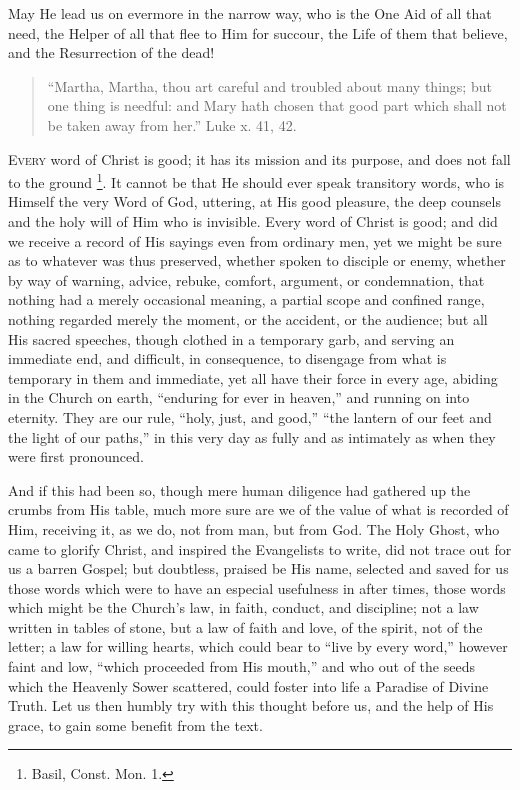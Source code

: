 May He lead us on evermore in the narrow way, who is the One Aid of
all that need, the Helper of all that flee to Him for succour, the
Life of them that believe, and the Resurrection of the dead!


\begin{quote}

``Martha, Martha, thou art careful and troubled about many
things; but one thing is needful: and Mary hath chosen that good
part which shall not be taken away from her.'' Luke x. 41, 42.

\end{quote}

E\textsc{very} word of Christ is good; it has its mission and its purpose,
and does not fall to the ground \footnote{Basil, Const. Mon. 1.}. It cannot be that He should ever speak transitory words, who
is Himself the very Word of God, uttering, at His good pleasure, the
deep counsels and the holy will of Him who is invisible. Every word of
Christ is good; and did we receive a record of His sayings even from
ordinary men, yet we might be sure as to whatever was thus preserved,
whether spoken to disciple or enemy, whether by way of warning,
advice, rebuke, comfort, argument, or condemnation, that nothing had a
merely occasional meaning, a partial scope and confined range, nothing
regarded merely the moment, or the accident, or the audience; but all
His sacred speeches, though clothed in a temporary garb, and serving
an immediate end, and difficult, in consequence, to disengage from
what is temporary in them and immediate, yet all have their force in
every age, abiding in the Church on earth, ``enduring for ever in
heaven,'' and running on into eternity. They are our rule,
``holy, just, and good,'' ``the lantern of our feet and
the light of our paths,'' in this very day as fully and as
intimately as when they were first pronounced.

And if this had been so, though mere human diligence had gathered
up the crumbs from His table, much more sure are we of the value of
what is recorded of Him, receiving it, as we do, not from man, but
from God. The Holy Ghost, who came to glorify Christ, and inspired the
Evangelists to write, did not trace out for us a barren Gospel; but
doubtless, praised be His name, selected and saved for us those words
which were to have an especial usefulness in after times, those words
which might be the Church's law, in faith, conduct, and discipline;
not a law written in tables of stone, but a law of faith and love, of
the spirit, not of the letter; a law for willing hearts, which could
bear to ``live by every word,'' however faint and low,
``which proceeded from His mouth,'' and who out of the seeds
which the Heavenly Sower scattered, could foster into life a Paradise
of Divine Truth. Let us then humbly try with this thought before us,
and the help of His grace, to gain some benefit from the text.

